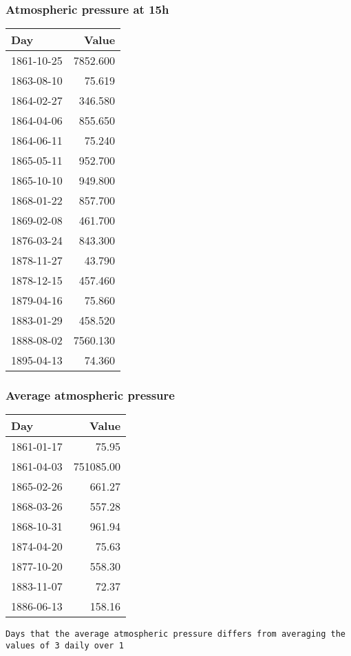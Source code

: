 \documentclass[]{article}
\begin{document}
\subsubsection{Atmospheric pressure at
15h}\label{atmospheric-pressure-at-15h-1}

\begin{longtable}[]{@{}lr@{}}
\toprule
Day & Value\tabularnewline
\midrule
\endhead
1861-10-25 & 7852.600\tabularnewline
1863-08-10 & 75.619\tabularnewline
1864-02-27 & 346.580\tabularnewline
1864-04-06 & 855.650\tabularnewline
1864-06-11 & 75.240\tabularnewline
1865-05-11 & 952.700\tabularnewline
1865-10-10 & 949.800\tabularnewline
1868-01-22 & 857.700\tabularnewline
1869-02-08 & 461.700\tabularnewline
1876-03-24 & 843.300\tabularnewline
1878-11-27 & 43.790\tabularnewline
1878-12-15 & 457.460\tabularnewline
1879-04-16 & 75.860\tabularnewline
1883-01-29 & 458.520\tabularnewline
1888-08-02 & 7560.130\tabularnewline
1895-04-13 & 74.360\tabularnewline
\bottomrule
\end{longtable}

\subsubsection{Average atmospheric
pressure}\label{average-atmospheric-pressure-1}

\begin{longtable}[]{@{}lr@{}}
\toprule
Day & Value\tabularnewline
\midrule
\endhead
1861-01-17 & 75.95\tabularnewline
1861-04-03 & 751085.00\tabularnewline
1865-02-26 & 661.27\tabularnewline
1868-03-26 & 557.28\tabularnewline
1868-10-31 & 961.94\tabularnewline
1874-04-20 & 75.63\tabularnewline
1877-10-20 & 558.30\tabularnewline
1883-11-07 & 72.37\tabularnewline
1886-06-13 & 158.16\tabularnewline
\bottomrule
\end{longtable}

\begin{verbatim}
Days that the average atmospheric pressure differs from averaging the values of 3 daily over 1
\end{verbatim}
\end{document}
